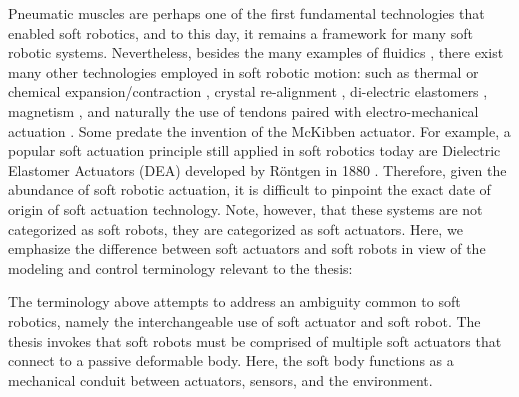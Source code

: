 Pneumatic muscles are perhaps one of the first fundamental technologies that enabled soft robotics, and to this day, it remains a framework for many soft robotic systems. Nevertheless, besides the many examples of fluidics \cite{Marchese2014,Marchese2016,Katzschmann2018,Suzumori1991,Mosadegh2014}, there exist many other technologies employed in soft robotic motion: such as thermal \cite{Wu2021Dec} or chemical expansion/contraction \cite{Tolley2014,Bartlett2015,Wehner2016}, crystal re-alignment \cite{Pilz2020,Lopez2018,Vantomme2021,Polygerinos2013}, di-electric elastomers \cite{Keplinger2011}, magnetism \cite{Roh2019Apr,KimYoonho2018,McDonald2020,Boyvat2017Jul}, and naturally the use of tendons paired with electro-mechanical actuation \cite{Renda2018,Bern2019,Kim2020Jun,Coevoet2017Feb,Wang2016Sep}. Some predate the invention of the McKibben actuator. For example, a popular soft actuation principle still applied in soft robotics today are Dielectric Elastomer Actuators (DEA) developed by R\"{o}ntgen in 1880 \cite{Rontgen1880}. Therefore, given the abundance of soft robotic actuation, it is difficult to pinpoint the exact date of origin of soft actuation technology. Note, however, that these systems are not categorized as soft robots, they are categorized as soft actuators. Here, we emphasize the difference between soft actuators and soft robots in view of the modeling and control terminology relevant to the thesis:

%
\vspace{-4mm}
%
\begin{rmk} The terminology above attempts to address an ambiguity common to soft robotics, namely the interchangeable use of soft actuator and soft robot. The thesis invokes that soft robots must be comprised of multiple soft actuators that connect to a passive deformable body. Here, the soft body functions as a mechanical conduit between actuators, sensors, and the environment.
\end{rmk}

